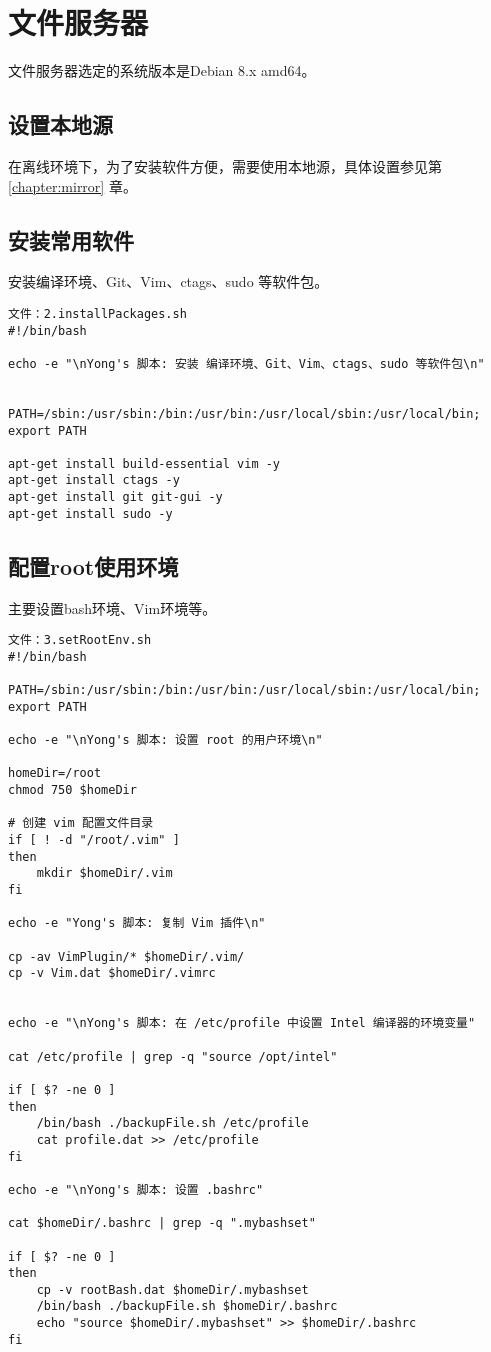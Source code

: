 ﻿\chapter{文件服务器}

文件服务器选定的系统版本是Debian 8.x amd64。

\section{设置本地源}
在离线环境下，为了安装软件方便，需要使用本地源，具体设置参见第\ref{chapter:mirror} 章。

\section{安装常用软件}
安装编译环境、Git、Vim、ctags、sudo 等软件包。
\begin{Verbatim}[]
文件：2.installPackages.sh
#!/bin/bash

echo -e "\nYong's 脚本: 安装 编译环境、Git、Vim、ctags、sudo 等软件包\n"


PATH=/sbin:/usr/sbin:/bin:/usr/bin:/usr/local/sbin:/usr/local/bin; export PATH

apt-get install build-essential vim -y
apt-get install ctags -y
apt-get install git git-gui -y
apt-get install sudo -y
\end{Verbatim}

\section{配置root使用环境}
主要设置bash环境、Vim环境等。
\begin{Verbatim}[]
文件：3.setRootEnv.sh
#!/bin/bash

PATH=/sbin:/usr/sbin:/bin:/usr/bin:/usr/local/sbin:/usr/local/bin; export PATH

echo -e "\nYong's 脚本: 设置 root 的用户环境\n"

homeDir=/root
chmod 750 $homeDir

# 创建 vim 配置文件目录
if [ ! -d "/root/.vim" ]
then
	mkdir $homeDir/.vim
fi

echo -e "Yong's 脚本: 复制 Vim 插件\n"

cp -av VimPlugin/* $homeDir/.vim/
cp -v Vim.dat $homeDir/.vimrc


echo -e "\nYong's 脚本: 在 /etc/profile 中设置 Intel 编译器的环境变量"

cat /etc/profile | grep -q "source /opt/intel"

if [ $? -ne 0 ]
then
	/bin/bash ./backupFile.sh /etc/profile
	cat profile.dat >> /etc/profile
fi

echo -e "\nYong's 脚本: 设置 .bashrc"

cat $homeDir/.bashrc | grep -q ".mybashset"

if [ $? -ne 0 ]
then
	cp -v rootBash.dat $homeDir/.mybashset
	/bin/bash ./backupFile.sh $homeDir/.bashrc
	echo "source $homeDir/.mybashset" >> $homeDir/.bashrc
fi
\end{Verbatim}

